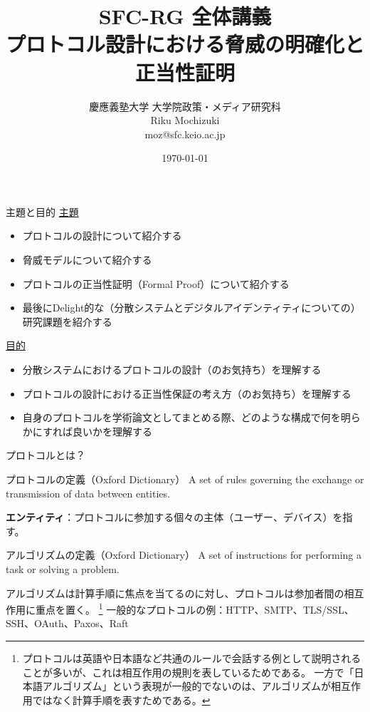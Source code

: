 \documentclass[aspectratio=169,10pt]{beamer}
\title{\textsc{SFC-RG 全体講義} \\ プロトコル設計における脅威の明確化と正当性証明}
\author{
    慶應義塾大学 大学院政策・メディア研究科\\
    \vspace{0.5em}
    Riku Mochizuki\\
    moz@sfc.keio.ac.jp
}
\date{\today}
\newenvironment{proofblock}[1][]
{\begin{block}{#1}\vspace{0.5em}}
{\vspace{0.5em}\end{block}}
\begin{document}
\begin{frame}
\titlepage
\end{frame}


\begin{frame}{主題と目的}
\underline{主題}
\begin{itemize}
    \item プロトコルの設計について紹介する
    \item 脅威モデルについて紹介する
    \item プロトコルの正当性証明（Formal Proof）について紹介する
    \item 最後にDelight的な（分散システムとデジタルアイデンティティについての）研究課題を紹介する
\end{itemize}

\underline{目的}
\begin{itemize}
    \item 分散システムにおけるプロトコルの設計（のお気持ち）を理解する
    \item プロトコルの設計における正当性保証の考え方（のお気持ち）を理解する
    \item 自身のプロトコルを学術論文としてまとめる際、どのような構成で何を明らかにすれば良いかを理解する
\end{itemize}
\end{frame}

\begin{frame}{プロトコルとは？}
\begin{proofblock}[プロトコルの定義（Oxford Dictionary）]
A set of rules governing the exchange or transmission of data between entities.
\end{proofblock}

\textbf{エンティティ}：プロトコルに参加する個々の主体（ユーザー、デバイス）を指す。



\begin{proofblock}[アルゴリズムの定義（Oxford Dictionary）]
A set of instructions for performing a task or solving a problem.
\end{proofblock}

アルゴリズムは計算手順に焦点を当てるのに対し、プロトコルは参加者間の相互作用に重点を置く。
\footnote{プロトコルは英語や日本語など共通のルールで会話する例として説明されることが多いが、これは相互作用の規則を表しているためである。
一方で「日本語アルゴリズム」という表現が一般的でないのは、アルゴリズムが相互作用ではなく計算手順を表すためである。}
一般的なプロトコルの例：HTTP、SMTP、TLS/SSL、SSH、OAuth、Paxos、Raft

\end{frame}
\end{document}
